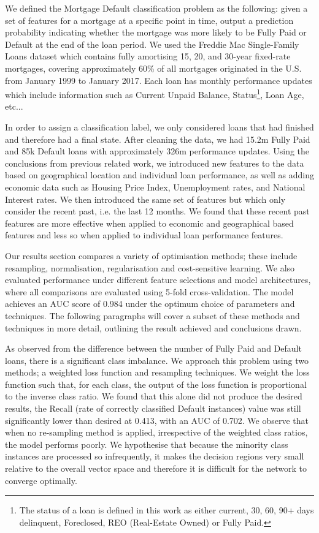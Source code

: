 We defined the Mortgage Default classification problem as the following: given a set of features for a mortgage at a specific point in time, output a prediction probability indicating whether the mortgage was more likely to be Fully Paid or Default at the end of the loan period. We used the Freddie Mac Single-Family Loans dataset which contains fully amortising 15, 20, and 30-year fixed-rate mortgages, covering approximately 60\% of all mortgages originated in the U.S. from January 1999 to January 2017. Each loan has monthly performance updates which include information such as Current Unpaid Balance, Status\footnote{The status of a loan is defined in this work as either current, 30, 60, 90+ days delinquent, Foreclosed, REO (Real-Estate Owned) or Fully Paid.}, Loan Age, etc...

In order to assign a classification label, we only considered loans that had finished and therefore had a final state. After cleaning the data, we had 15.2m Fully Paid and 85k Default loans with approximately 326m performance updates. Using the conclusions from previous related work, we introduced new features to the data based on geographical location and individual loan performance, as well as adding economic data such as Housing Price Index, Unemployment rates, and National Interest rates. We then introduced the same set of features but which only consider the recent past, i.e. the last 12 months. We found that these recent past features are more effective when applied to economic and geographical based features and less so when applied to individual loan performance features. 

Our results section compares a variety of optimisation methods; these include resampling, normalisation, regularisation and cost-sensitive learning. We also evaluated performance under different feature selections and model architectures, where all comparisons are evaluated using 5-fold cross-validation. The model achieves an AUC score of 0.984 under the optimum choice of parameters and techniques. The following paragraphs will cover a subset of these methods and techniques in more detail, outlining the result achieved and conclusions drawn. 

As observed from the difference between the number of Fully Paid and Default loans, there is a significant class imbalance. We approach this problem using two methods; a weighted loss function and resampling techniques. We weight the loss function such that, for each class, the output of the loss function is proportional to the inverse class ratio. We found that this alone did not produce the desired results, the Recall (rate of correctly classified Default instances) value was still significantly lower than desired at 0.413, with an AUC of 0.702. We observe that when no re-sampling method is applied, irrespective of the weighted class ratios, the model performs poorly. We hypothesise that because the minority class instances are processed so infrequently, it makes the decision regions very small relative to the overall vector space and therefore it is difficult for the network to converge optimally. 

